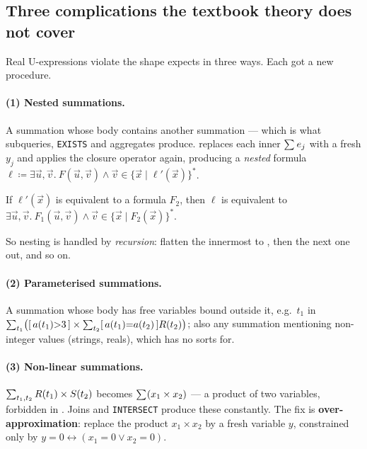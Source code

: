 
\subsection{Three complications the textbook theory does not cover}
\label{sec:lia-challenges}

Real U-expressions violate the shape \liastar{} expects in three ways. Each got a new
procedure.

\paragraph{(1) Nested summations.} A summation whose body contains another summation ---
which is what subqueries, \lstinline|EXISTS| and aggregates produce. \sqlsolver{} replaces
each inner $\sum_{}e_j$ with a fresh $y_j$ and applies the closure operator again, producing
a \emph{nested} \liastar{} formula
$\ell \coloneqq \exists\vec u,\vec v.\ F(\vec u,\vec v)\wedge\vec v\in\{\vec x\mid \ell'(\vec x)\}^*$.

\begin{theorem}
If $\ell'(\vec x)$ is equivalent to a \lia{} formula $F_2$, then $\ell$ is equivalent to
$\exists\vec u,\vec v.\ F_1(\vec u,\vec v)\wedge\vec v\in\{\vec x\mid F_2(\vec x)\}^*$.
\end{theorem}
So nesting is handled by \emph{recursion}: flatten the innermost \liastar{} to \lia{}, then
the next one out, and so on.

\paragraph{(2) Parameterised summations.} A summation whose body has free variables bound
outside it, e.g.\ $t_1$ in
$\sum_{t_1}\bigl([\,a(t_1){>}3\,]\times\sum_{t_2}[\,a(t_1){=}a(t_2)\,]R(t_2)\bigr)$; also
any summation mentioning non-integer values (strings, reals), which \liastar{} has no sorts
for.

\paragraph{(3) Non-linear summations.} $\sum_{t_1,t_2}R(t_1)\times S(t_2)$ becomes
$\sum_{}(x_1\times x_2)$ --- a product of two variables, forbidden in \lia{}. Joins and
\lstinline|INTERSECT| produce these constantly. The fix is \textbf{over-approximation}:
replace the product $x_1 \times x_2$ by a fresh variable $y$, constrained only by
$y = 0 \leftrightarrow (x_1=0 \vee x_2 = 0)$.

